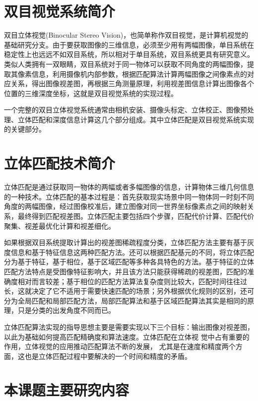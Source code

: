 \section{双目视觉系统简介}

双目立体视觉(Binocular Stereo Vision)，也简单称作双目视觉，是计算机视觉的基础研究分支。由于要获取图像的三维信息，必须至少用有两幅图像，单目系统在稳定性上也远远不如双目系统，所以相对于单目系统，双目系统更具有研究意义。类似人类拥有一双眼睛，双目系统对于同一物体可以获取不同角度的两幅图像，提取其像素信息，利用摄像机内部参数，根据匹配算法计算两幅图像之间像素点的对应关系，得出图像视差图，再根据三角测量原理，利用视差图信息计算出图像各个位置的三维深度坐标，这就是双目视觉系统的实现过程。

一个完整的双目立体视觉系统通常由相机安装、摄像头标定、立体校正、图像预处理、立体匹配和深度信息计算这几个部分组成。其中立体匹配是双目视觉系统实现的关键部分。

\section{立体匹配技术简介}

立体匹配是通过获取同一物体的两幅或者多幅图像的信息，计算物体三维几何信息的一种技术。立体匹配的基本过程是：首先获取现实场景中同一物体同一时刻不同角度的两幅图像，经过图像校准后，建立图像对同一世界坐标像素点之间的映射关系，最终得到匹配视差图。立体匹配主要包括四个步骤，匹配代价计算、匹配代价聚集、视差最优化计算和视差细化。

如果根据双目系统提取计算出的视差图稀疏程度分类，立体匹配方法主要有基于灰度信息和基于特征信息这两种匹配方法。还可以根据匹配基元的不同，将立体匹配分为基于特征，基于相位，基于区域匹配等多种各具特色的方法。基于特征的立体匹配方法特点是受图像特征影响大，并且该方法只能获得稀疏的视差图，匹配的准确度相对而言较差；基于相位的匹配方法算法复杂度则比较大，匹配时间往往过长，这就决定了它不适用于需要快速匹配的场景；另外根据优化规则的区别，还可分为全局匹配和局部匹配方法，局部匹配算法和基于区域匹配算法其实是相同的原理，只是分类的出发角度不同而已。

立体匹配算法实现的指导思想主要是需要实现以下三个目标：输出图像对视差图，以此为基础如何提高匹配精确度和算法速度。立体匹配在立体视 觉中占有重要的作用，立体视觉的应用推动匹配算法不断的发展， 尤其是在速度和精度两个方面，这也是立体匹配过程中要解决的一个时间和精度的矛盾。

\section{本课题主要研究内容}

